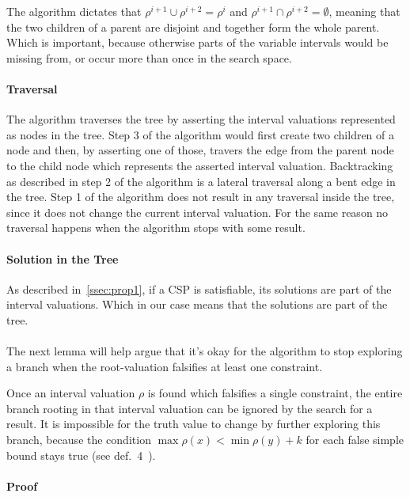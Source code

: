 The algorithm dictates that $\rho^{i+1} \cup \rho^{i+2} = \rho^i$ and $\rho^{i+1} \cap \rho^{i+2} = \emptyset$, meaning that the two children of a parent are disjoint and together form the whole parent.
Which is important, because otherwise parts of the variable intervals would be missing from, or occur more than once in the search space.

\paragraph{Traversal}
The algorithm traverses the tree by asserting the interval valuations represented as nodes in the tree.
Step 3 of the algorithm would first create two children of a node and then, by asserting one of those, travers the edge from the parent node to the child node which represents the asserted interval valuation.
Backtracking as described in step 2 of the algorithm is a lateral traversal along a bent edge in the tree.
Step 1 of the algorithm does not result in any traversal inside the tree, since it does not change the current interval valuation.
For the same reason no traversal happens when the algorithm stops with some result.

\paragraph{Solution in the Tree}
As described in~\ref{ssec:prop1}, if a CSP is satisfiable, its solutions are part of the interval valuations.
Which in our case means that the solutions are part of the tree.

\paragraph{}
The next lemma will help argue that it's okay for the algorithm to stop exploring a branch when the root-valuation falsifies at least one constraint.

\begin{lemma}\label{lemma:false-branches}
    Once an interval valuation $\rho$ is found which falsifies a single constraint, the entire branch rooting in that interval valuation can be ignored by the search for a result.
    It is impossible for the truth value to change by further exploring this branch, because the condition $\max \rho(x) < \min \rho(y) + k$ for each false simple bound stays true (see def.~4~\cite{MF19}). 
\end{lemma}

\paragraph{Proof}

